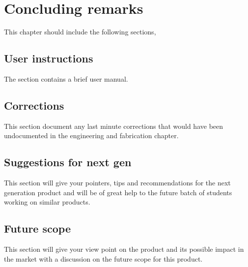 
\chapter{Concluding remarks}

This chapter should include the following sections,

\section{User instructions}

The section contains a brief user manual.

\section{Corrections}

This section document any last minute corrections that would have
been undocumented in the engineering and fabrication chapter.

\section{Suggestions for next gen}

This section will give your pointers, tips and recommendations for
the next generation product and will be of great help to the future
batch of students working on similar products.

\section{Future scope}

This section will give your view point on the product and its possible
impact in the market with a discussion on the future scope for this
product.
